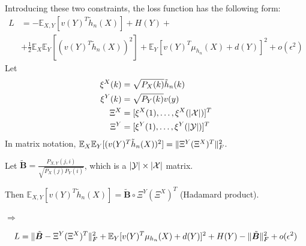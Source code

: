 \documentclass{article}
\DeclarePairedDelimiter\abs{\lvert}{\rvert}
\DeclarePairedDelimiter\norm{\lVert}{\rVert}
\def\E{\mathbb{E}}
\DeclareMathOperator\diag{diag}
\DeclareMathOperator\artanh{artanh}
\begin{document}
Introducing these two constraints, the loss function has the following form:
\begin{align*}
L &= -\E_{X,Y}[v(Y)^T\tilde{h}_n(X)] + H(Y) +\\
&+\frac{1}{2}\E_X\E_Y[(v(Y)^T\tilde{h}_n(X))^2] + \E_Y[v(Y)^T\mu_{h_n}(X)+d(Y)]^2 + o(\epsilon^2)
\end{align*}
Let 
\begin{subequations}
\begin{align}
\xi^X(k) & = \sqrt{P_X(k)}\tilde{h}_n(k)  \\
\xi^Y(k) & = \sqrt{P_Y(k)}v(y)  \\
\Xi^X & = [\xi^X(1),\dots,\xi^X(\abs{\mathcal{X}})]^T \\ %
\Xi^Y & = [\xi^Y(1),\dots,\xi^Y(\abs{\mathcal{Y}})]^T    %
\end{align}
\end{subequations}
In matrix notation, $\E_X\E_Y[(v(Y)^T\tilde{h}_n(X))^2]=\norm{\Xi^Y(\Xi^X)^T}^2_F$.

Let $\tilde{\bm{B}}=\frac{P_{X,Y}(j,i)}{\sqrt{P_X(j)P_Y(i)}}$, which is a $\abs{\mathcal{Y}} \times \abs{\mathcal{X}}$ matrix.

Then $\E_{X,Y}[v(Y)^T\tilde{h}_n(X)] = \tilde{\bm{B}}\circ\Xi^Y(\Xi^X)^T $ (Hadamard product).

$\Rightarrow$

\begin{equation}
L = \norm{\tilde{\bm{B}}-\Xi^Y(\Xi^X)^T}_F^2 + \E_Y[v(Y)^T\mu_{h_n}(X)+d(Y)]^2 + H(Y) -\norm{\tilde{\bm{B}}}_F^2 + o(\epsilon^2)
\end{equation}


\end{document}
